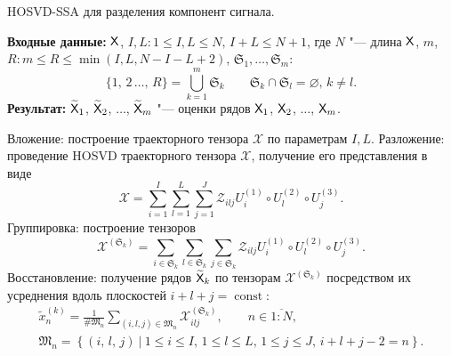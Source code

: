 \documentclass[specialist,
    substylefile = spbu.rtx,
    subf,href,colorlinks=true, 12pt]{disser}
\theoremstyle{plain}
\theoremstyle{definition}
\theoremstyle{remark}
\newcommand{\Input}{\textbf{Входные данные: }}
\newcommand{\Output}{\textbf{Результат: }}
\begin{document}
   \begin{algorithm}[!h]
        \caption{HOSVD-SSA для разделения компонент сигнала.}
        \label{alg:hosvd-ssa-components}
        \Input $\mathsf{X}$, $I,L: 1\leqslant I,L \leqslant N,\, I + L \leqslant N + 1$, где $N$ "--- длина $\mathsf{X}$, 
         $m$,\linebreak $R: m \leqslant R\leqslant \min(I, L, N-I-L+2)$,
        $\mathfrak{S}_1, \ldots, \mathfrak{S}_m$:
        \[
            \{1,\, 2\,\ldots,\, R\}=\bigcup_{k=1}^{m}\mathfrak{S}_k \qquad \mathfrak{S}_k\cap \mathfrak{S}_l =\varnothing,\, 
        k\ne l.
        \]
        \Output $\widetilde{\mathsf{X}}_1$, $\widetilde{\mathsf{X}}_2$, $\ldots$, $\widetilde{\mathsf{X}}_m$ "--- оценки рядов 
        $\mathsf{X}_1$, $\mathsf{X}_2$, $\ldots$, $\mathsf{X}_m$.
        \begin{algorithmic}[1]
            \State \label{alg:first-step}
            Вложение: построение траекторного тензора $\mathcal{X}$ по параметрам $I, L$.
            \State \label{alg:second-step}
            Разложение: проведение HOSVD траекторного тензора $\mathcal{X}$, получение его представления в виде
            \begin{equation}
                \mathcal{X}=\sum_{i=1}^{I} \sum_{l=1}^{L} \sum_{j=1}^{J} \mathcal{Z}_{ilj} U^{(1)}_{i}
                \circ U^{(2)}_{l} \circ U^{(3)}_{j}.
                \label{eq:trajectory-hosvd}
            \end{equation}
            \State Группировка: построение тензоров
            \begin{equation*}
                \mathcal{X}^{(\mathfrak{S}_k)}=\sum_{i \in \mathfrak{S}_k} \sum_{l\in \mathfrak{S}_k} \sum_{j\in \mathfrak{S}_k}
                \mathcal{Z}_{ilj} U^{(1)}_{i}\circ U^{(2)}_{l} \circ U^{(3)}_{j}.
            \end{equation*}
            \State Восстановление: получение рядов $\widetilde{\mathsf{X}}_k$ по тензорам
            $\mathcal{X}^{(\mathfrak{S}_k)}$ посредством их усреднения вдоль
            плоскостей $i+l+j=\operatorname{const}$:
            \begin{gather*}
                \tilde{x}^{(k)}_n=\frac{1}{\#\mathfrak{M}_n}\sum_{(i,l,j)\in \mathfrak{M}_n} \mathcal{X}^{(\mathfrak{S}_k)}_{ilj},\qquad n\in \overline{1:N},         \\
                \mathfrak{M}_n=\left\{(i,\, l,\, j)\: \Big| \: 1\leqslant i \leqslant I,\, 1\leqslant l \leqslant L,\, 1\leqslant j \leqslant J,\, i+l+j-2=n\right\}.
            \end{gather*}
        \end{algorithmic}
    \end{algorithm}
\end{document}
